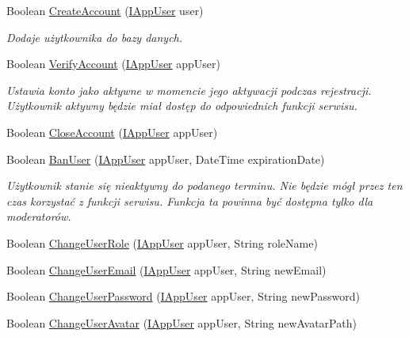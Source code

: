 \begin{DoxyCompactItemize}
\item 
Boolean \hyperlink{interface_contract_1_1_i_app_user_service_a724a95f1e44e8a7b37fe6ead5261361e}{Create\+Account} (\hyperlink{interface_contract_1_1_i_app_user}{I\+App\+User} user)
\begin{DoxyCompactList}\small\item\em Dodaje użytkownika do bazy danych. \end{DoxyCompactList}\item 
Boolean \hyperlink{interface_contract_1_1_i_app_user_service_af86ad71018d6fe4e6a9f3ad9c941dad1}{Verify\+Account} (\hyperlink{interface_contract_1_1_i_app_user}{I\+App\+User} app\+User)
\begin{DoxyCompactList}\small\item\em Ustawia konto jako aktywne w momencie jego aktywacji podczas rejestracji. Użytkownik aktywny będzie miał dostęp do odpowiednich funkcji serwisu. \end{DoxyCompactList}\item 
Boolean \hyperlink{interface_contract_1_1_i_app_user_service_ac9750114ef81e7efc0fa6251bfa84bc7}{Close\+Account} (\hyperlink{interface_contract_1_1_i_app_user}{I\+App\+User} app\+User)
\item 
Boolean \hyperlink{interface_contract_1_1_i_app_user_service_a8304095666e73cbf8c8d7d92e96d235c}{Ban\+User} (\hyperlink{interface_contract_1_1_i_app_user}{I\+App\+User} app\+User, Date\+Time expiration\+Date)
\begin{DoxyCompactList}\small\item\em Użytkownik stanie się nieaktywny do podanego terminu. Nie będzie mógł przez ten czas korzystać z funkcji serwisu. Funkcja ta powinna być dostępna tylko dla moderatorów. \end{DoxyCompactList}\item 
Boolean \hyperlink{interface_contract_1_1_i_app_user_service_aaf9bccb0516b09cf063fd9bd6d2255b8}{Change\+User\+Role} (\hyperlink{interface_contract_1_1_i_app_user}{I\+App\+User} app\+User, String role\+Name)
\item 
Boolean \hyperlink{interface_contract_1_1_i_app_user_service_a649b278ad292ccc1ab705a6afa55d884}{Change\+User\+Email} (\hyperlink{interface_contract_1_1_i_app_user}{I\+App\+User} app\+User, String new\+Email)
\item 
Boolean \hyperlink{interface_contract_1_1_i_app_user_service_a015b20a2d16c824079dc5000b68b2d0b}{Change\+User\+Password} (\hyperlink{interface_contract_1_1_i_app_user}{I\+App\+User} app\+User, String new\+Password)
\item 
Boolean \hyperlink{interface_contract_1_1_i_app_user_service_a16e1c4874cb93967c50d17893ae8c30c}{Change\+User\+Avatar} (\hyperlink{interface_contract_1_1_i_app_user}{I\+App\+User} app\+User, String new\+Avatar\+Path)
\end{DoxyCompactItemize}


